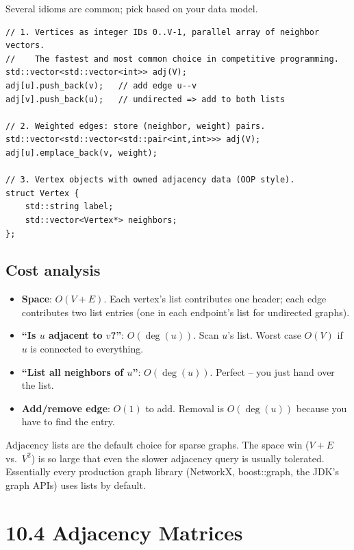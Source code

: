\documentclass[11pt]{article}
\begin{document}
Several idioms are common; pick based on your data model.

\begin{lstlisting}[basicstyle=\ttfamily\small,frame=single]
// 1. Vertices as integer IDs 0..V-1, parallel array of neighbor vectors.
//    The fastest and most common choice in competitive programming.
std::vector<std::vector<int>> adj(V);
adj[u].push_back(v);   // add edge u--v
adj[v].push_back(u);   // undirected => add to both lists

// 2. Weighted edges: store (neighbor, weight) pairs.
std::vector<std::vector<std::pair<int,int>>> adj(V);
adj[u].emplace_back(v, weight);

// 3. Vertex objects with owned adjacency data (OOP style).
struct Vertex {
    std::string label;
    std::vector<Vertex*> neighbors;
};
\end{lstlisting}

\subsection*{Cost analysis}

\begin{itemize}[leftmargin=*]
    \item \textbf{Space}: $O(V + E)$. Each vertex's list contributes one header; each edge contributes two list entries (one in each endpoint's list for undirected graphs).
    \item \textbf{``Is $u$ adjacent to $v$?''}: $O(\deg(u))$. Scan $u$'s list. Worst case $O(V)$ if $u$ is connected to everything.
    \item \textbf{``List all neighbors of $u$''}: $O(\deg(u))$. Perfect -- you just hand over the list.
    \item \textbf{Add/remove edge}: $O(1)$ to add. Removal is $O(\deg(u))$ because you have to find the entry.
\end{itemize}

\begin{ideabox}
Adjacency lists are the default choice for sparse graphs. The space win ($V + E$ vs.\ $V^2$) is so large that even the slower adjacency query is usually tolerated. Essentially every production graph library (NetworkX, boost::graph, the JDK's graph APIs) uses lists by default.
\end{ideabox}

\section{10.4 Adjacency Matrices}
\end{document}
